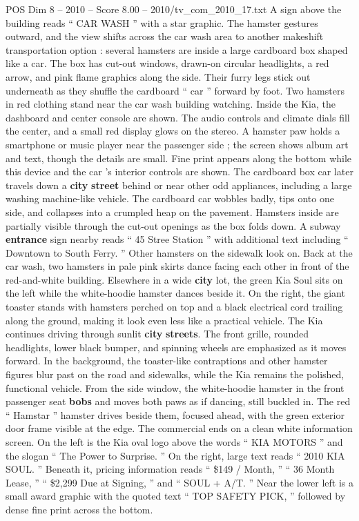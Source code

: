 \begin{textsample}{POS Dim 8 – 2010 – Score 8.00 – 2010/tv\_com\_2010\_17.txt}
A sign above the building reads “ CAR WASH ” with a star graphic.
The hamster gestures outward, and the view shifts across the car wash area to another makeshift transportation option : several hamsters are inside a large cardboard box shaped like a car.
The box has cut-out windows, drawn-on circular headlights, a red arrow, and pink flame graphics along the side.
Their furry legs stick out underneath as they shuffle the cardboard “ car ” forward by foot.
Two hamsters in red clothing stand near the car wash building watching.
Inside the Kia, the dashboard and center console are shown.
The audio controls and climate dials fill the center, and a small red display glows on the stereo.
A hamster paw holds a smartphone or music player near the passenger side ; the screen shows album art and text, though the details are small.
Fine print appears along the bottom while this device and the car ’s interior controls are shown.
The cardboard box car later travels down a \textbf{city} \textbf{street} behind or near other odd appliances, including a large washing machine-like vehicle.
The cardboard car wobbles badly, tips onto one side, and collapses into a crumpled heap on the pavement.
Hamsters inside are partially visible through the cut-out openings as the box folds down.
A subway \textbf{entrance} sign nearby reads “ 45 Stree Station ” with additional text including “ Downtown to South Ferry. ” Other hamsters on the sidewalk look on.
Back at the car wash, two hamsters in pale pink skirts dance facing each other in front of the red-and-white building.
Elsewhere in a wide \textbf{city} lot, the green Kia Soul sits on the left while the white-hoodie hamster dances beside it.
On the right, the giant toaster stands with hamsters perched on top and a black electrical cord trailing along the ground, making it look even less like a practical vehicle.
The Kia continues driving through sunlit \textbf{city} \textbf{streets}.
The front grille, rounded headlights, lower black bumper, and spinning wheels are emphasized as it moves forward.
In the background, the toaster-like contraptions and other hamster figures blur past on the road and sidewalks, while the Kia remains the polished, functional vehicle.
From the side window, the white-hoodie hamster in the front passenger seat \textbf{bobs} and moves both paws as if dancing, still buckled in.
The red “ Hamstar ” hamster drives beside them, focused ahead, with the green exterior door frame visible at the edge.
The commercial ends on a clean white information screen.
On the left is the Kia oval logo above the words “ KIA MOTORS ” and the slogan “ The Power to Surprise. ” On the right, large text reads “ 2010 KIA SOUL. ” Beneath it, pricing information reads “ \$149 / Month, ” “ 36 Month Lease, ” “ \$2,299 Due at Signing, ” and “ SOUL + A/T. ” Near the lower left is a small award graphic with the quoted text “ TOP SAFETY PICK, ” followed by dense fine print across the bottom.

\end{textsample}
